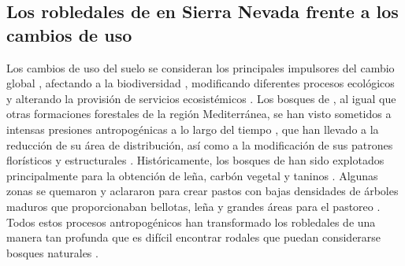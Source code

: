\subsection*{Los robledales de \Qp en Sierra Nevada frente a los cambios de uso 
}\label{sec:discussions:uso}

Los cambios de uso del suelo se consideran los principales impulsores del cambio global \autocites{Butchartetal2010GlobalBiodiversity,Winkleretal2021GlobalLand}, afectando a la biodiversidad \autocites{Sala2000GlobalBiodiversity}, modificando diferentes procesos ecológicos \autocites{Lindenmayeretal2012LandUse} y alterando la provisión de servicios ecosistémicos \autocites{Hasanetal2020ImpactLand}. Los bosques de \Qp, al igual que otras formaciones forestales de la región Mediterránea, se han visto sometidos a intensas presiones antropogénicas a lo largo del tiempo \autocites{GarciaJimenez20099230Robledales, AlbaSanchezetal2021EarlyAnthropogenic}, que han llevado a la reducción de su área de distribución, así como a la modificación de sus patrones florísticos y estructurales \autocites{Gavilanetal2000EffectsDisturbance,Calvoetal1999PostfireSuccession,Tarregaetal2006ForestStructure}. Históricamente, los bosques de \Qp han sido explotados principalmente para la obtención de leña, carbón vegetal y taninos \autocites{RuizdelaTorre2006FloraMayor,SanchezPalomaresetal2008EstacionesEcologicas}. Algunas zonas se quemaron y aclararon para crear pastos con bajas densidades de árboles maduros que proporcionaban bellotas, leña y grandes áreas para el pastoreo \autocites{HerreraCalvo2016UsoPastoral,Alvarezetal2009CambiosEstructura,ValbuenaCarabanaGil2017CentenaryCoppicing}. Todos estos procesos antropogénicos han transformado los robledales de una manera tan profunda que es difícil encontrar rodales que puedan considerarse bosques naturales \autocites{RuizdelaTorre2006FloraMayor}. 

